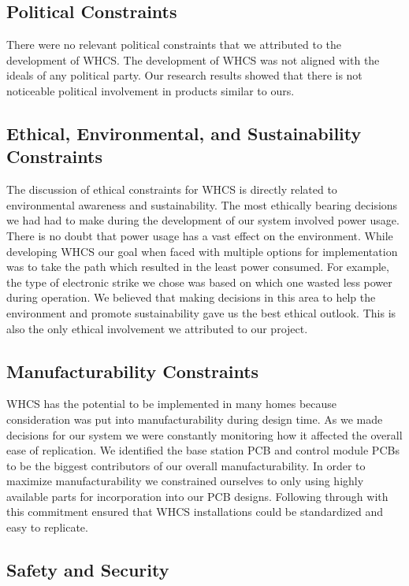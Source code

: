 \subsection{Political Constraints}
There were no relevant political constraints that we attributed to the
development of WHCS. The development of WHCS was not aligned with the ideals of
any political party. Our research results showed that there is not noticeable
political involvement in products similar to ours.

\subsection{Ethical, Environmental, and Sustainability Constraints}
The discussion of ethical constraints for WHCS is directly related to
environmental awareness and sustainability. The most ethically bearing
decisions we had had to make during the development of our system involved
power usage. There is no doubt that power usage has a vast effect on the
environment. While developing WHCS our goal when faced with multiple options
for implementation was to take the path which resulted in the least power
consumed. For example, the type of electronic strike we chose was based on
which one wasted less power during operation. We believed that making decisions
in this area to help the environment and promote sustainability gave us the
best ethical outlook. This is also the only ethical involvement we 
attributed to our project.

\subsection{Manufacturability Constraints}

WHCS has the potential to be implemented in many homes because
consideration was put into manufacturability during design time. As we made
decisions for our system we were constantly monitoring how it affected the
overall ease of replication. We identified the base station PCB and
control module PCBs to be the biggest contributors of our overall
manufacturability. In order to maximize manufacturability we constrained
ourselves to only using highly available parts for incorporation into our PCB
designs. Following through with this commitment ensured that WHCS
installations could be standardized and easy to replicate.

\subsection{Safety and Security}
\label{sec:safety-sec}

